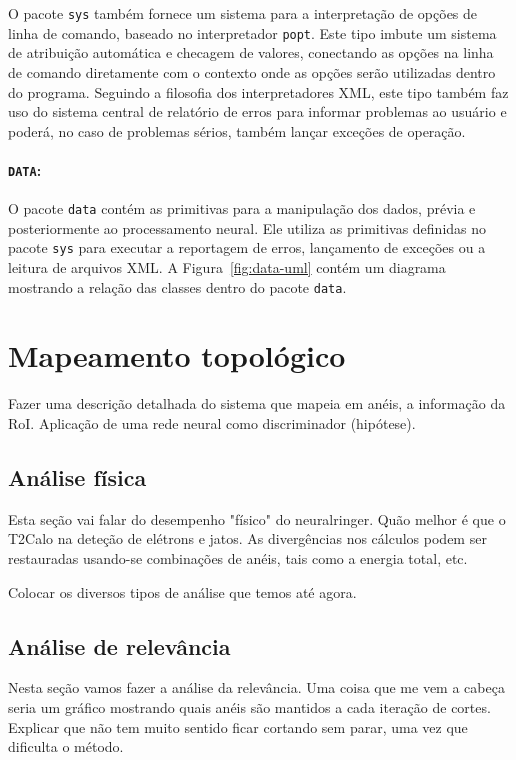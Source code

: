 O pacote \texttt{sys} também fornece um sistema para a interpretação de opções
de linha de comando, baseado no interpretador \texttt{popt}. Este tipo imbute
um sistema de atribuição automática e checagem de valores, conectando as
opções na linha de comando diretamente com o contexto onde as opções serão
utilizadas dentro do programa. Seguindo a filosofia dos interpretadores XML,
este tipo também faz uso do sistema central de relatório de erros para
informar problemas ao usuário e poderá, no caso de problemas sérios, também
lançar exceções de operação.

\paragraph{\texttt{DATA}:} O pacote \texttt{data} contém as primitivas para a
manipulação dos dados, prévia e posteriormente ao processamento neural. Ele
utiliza as primitivas definidas no pacote \texttt{sys} para executar a
reportagem de erros, lançamento de exceções ou a leitura de arquivos XML. A
Figura~\ref{fig:data-uml} contém um diagrama mostrando a relação das classes
dentro do pacote \texttt{data}.

\section{Mapeamento topológico}

Fazer uma descrição detalhada do sistema que mapeia em anéis, a informação da
RoI. Aplicação de uma rede neural como discriminador (hipótese).

\subsection{Análise física}

Esta seção vai falar do desempenho "físico" do neuralringer. Quão melhor é que
o T2Calo na deteção de elétrons e jatos. As divergências nos cálculos podem
ser restauradas usando-se combinações de anéis, tais como a energia total,
etc.

Colocar os diversos tipos de análise que temos até agora.

\subsection{Análise de relevância}

Nesta seção vamos fazer a análise da relevância. Uma coisa que me vem a cabeça
seria um gráfico mostrando quais anéis são mantidos a cada iteração de
cortes. Explicar que não tem muito sentido ficar cortando sem parar, uma vez
que dificulta o método.

